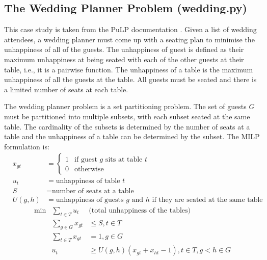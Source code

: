 \subsection{The Wedding Planner Problem (wedding.py)} \label{sbs:wedding}

This case study is taken from the PuLP documentation \cite{pulp}. Given a list of wedding attendees, a wedding planner must come up with a seating plan to minimise the unhappiness of all of the guests. The unhappiness of guest is defined as their maximum unhappiness at being seated with each of the other guests at their table, i.e., it is a pairwise function. The unhappiness of a table is the maximum unhappiness of all the guests at the table. All guests must be seated and there is a limited number of seats at each table.

The wedding planner problem is a set partitioning problem. The set of guests $G$ must be partitioned into multiple subsets, with each subset seated at the same table. The cardinality of the subsets is determined by the number of seats at a table and the unhappiness of a table can be determined by the subset. The \ac{MILP} formulation is:
\[
\begin{array}{rrl}
& x_{gt} &= \begin{cases} 1 & \text{if guest $g$ sits at table $t$} \\
 0 & \text{otherwise} \end{cases} \\
& u_t &= \text{unhappiness of table $t$} \\
& S &= \text{number of seats at a table} \\
& U(g, h) &= \text{unhappiness of guests $g$ and $h$ if they are seated at the same table}
\end{array}
\]\[
\begin{array}{rrl}
\min & \displaystyle \sum_{t \in T} u_t & \text{(total unhappiness of the tables)} \\
& \displaystyle \sum_{g \in G} x_{gt} &\leq S, t \in T \\
& \displaystyle \sum_{t \in T} x_{gt} &=1, g \in G \\
& u_t &\geq U(g, h) (x_{gt} + x_{ht} - 1), t \in T, g < h \in G
\end{array}
\]

